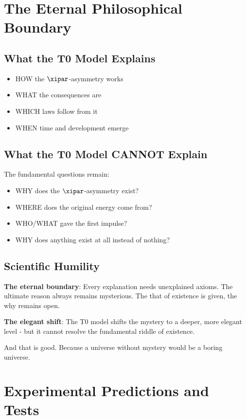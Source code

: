 	\section{The Eternal Philosophical Boundary}
	
	\subsection{What the T0 Model Explains}
	
	\begin{itemize}
		\item HOW the $\xipar$-asymmetry works
		\item WHAT the consequences are
		\item WHICH laws follow from it
		\item WHEN time and development emerge
	\end{itemize}
	
	\subsection{What the T0 Model CANNOT Explain}
	
	The fundamental questions remain:
	\begin{itemize}
		\item WHY does the $\xipar$-asymmetry exist?
		\item WHERE does the original energy come from?
		\item WHO/WHAT gave the first impulse?
		\item WHY does anything exist at all instead of nothing?
	\end{itemize}
	
	\subsection{Scientific Humility}
	
	\textbf{The eternal boundary}:
	Every explanation needs unexplained axioms. The ultimate reason always remains mysterious. The that of existence is given, the why remains open.
	
	\textbf{The elegant shift}:
	The T0 model shifts the mystery to a deeper, more elegant level - but it cannot resolve the fundamental riddle of existence.
	
	And that is good. Because a universe without mystery would be a boring universe.
	
	\section{Experimental Predictions and Tests}
	
